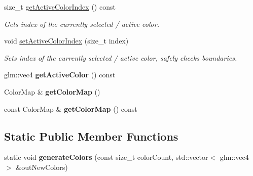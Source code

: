 \begin{DoxyCompactItemize}
\mbox{\label{classpepr3d_1_1_color_manager_a3532df102b706a03bc0e23401c457e4f}} 
size\+\_\+t \mbox{\hyperlink{classpepr3d_1_1_color_manager_a3532df102b706a03bc0e23401c457e4f}{get\+Active\+Color\+Index}} () const
\begin{DoxyCompactList}\small\item\em Gets index of the currently selected / active color. \end{DoxyCompactList}\item 
\mbox{\label{classpepr3d_1_1_color_manager_a81d621c28e948d1b3159dde1bcb73aea}} 
void \mbox{\hyperlink{classpepr3d_1_1_color_manager_a81d621c28e948d1b3159dde1bcb73aea}{set\+Active\+Color\+Index}} (size\+\_\+t index)
\begin{DoxyCompactList}\small\item\em Sets index of the currently selected / active color, safely checks boundaries. \end{DoxyCompactList}\item 
\mbox{\label{classpepr3d_1_1_color_manager_a928abdce32ef88875b11a370924a4fb4}} 
glm\+::vec4 {\bfseries get\+Active\+Color} () const
\item 
\mbox{\label{classpepr3d_1_1_color_manager_a7c86d46f583135d81ffe2842a8a2f8d1}} 
Color\+Map \& {\bfseries get\+Color\+Map} ()
\item 
\mbox{\label{classpepr3d_1_1_color_manager_acafb11f4d679dfe058c43ac3edc8a47c}} 
const Color\+Map \& {\bfseries get\+Color\+Map} () const
\end{DoxyCompactItemize}
\subsection*{Static Public Member Functions}
\begin{DoxyCompactItemize}
\item 
\mbox{\label{classpepr3d_1_1_color_manager_a9c9dcef30e057653f1ecc55071fdf12c}} 
static void {\bfseries generate\+Colors} (const size\+\_\+t color\+Count, std\+::vector$<$ glm\+::vec4 $>$ \&out\+New\+Colors)
\end{DoxyCompactItemize}
